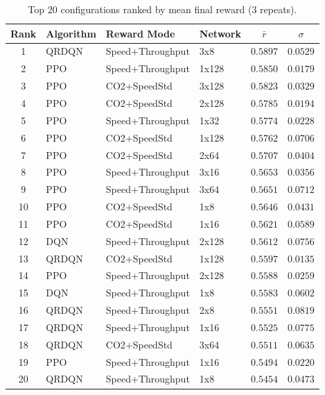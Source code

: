 \begin{table}[htbp]
\centering
\caption{Top 20 configurations ranked by mean final reward (3 repeats).}
\label{tab:top20}
\begin{tabular}{clllcc}
\toprule
Rank & Algorithm & Reward Mode & Network & $\bar{r}$ & $\sigma$ \\
\midrule
1 & QRDQN & Speed+Throughput & 3x8 & $0.5897$ & $0.0529$ \\
2 & PPO & Speed+Throughput & 1x128 & $0.5850$ & $0.0179$ \\
3 & PPO & CO2+SpeedStd & 3x128 & $0.5823$ & $0.0329$ \\
4 & PPO & CO2+SpeedStd & 2x128 & $0.5785$ & $0.0194$ \\
5 & PPO & Speed+Throughput & 1x32 & $0.5774$ & $0.0228$ \\
6 & PPO & CO2+SpeedStd & 1x128 & $0.5762$ & $0.0706$ \\
7 & PPO & CO2+SpeedStd & 2x64 & $0.5707$ & $0.0404$ \\
8 & PPO & Speed+Throughput & 3x16 & $0.5653$ & $0.0356$ \\
9 & PPO & Speed+Throughput & 3x64 & $0.5651$ & $0.0712$ \\
10 & PPO & CO2+SpeedStd & 1x8 & $0.5646$ & $0.0431$ \\
11 & PPO & CO2+SpeedStd & 1x16 & $0.5621$ & $0.0589$ \\
12 & DQN & Speed+Throughput & 2x128 & $0.5612$ & $0.0756$ \\
13 & QRDQN & CO2+SpeedStd & 1x128 & $0.5597$ & $0.0135$ \\
14 & PPO & Speed+Throughput & 2x128 & $0.5588$ & $0.0259$ \\
15 & DQN & Speed+Throughput & 1x8 & $0.5583$ & $0.0602$ \\
16 & QRDQN & Speed+Throughput & 2x8 & $0.5551$ & $0.0819$ \\
17 & QRDQN & Speed+Throughput & 1x16 & $0.5525$ & $0.0775$ \\
18 & QRDQN & CO2+SpeedStd & 3x64 & $0.5511$ & $0.0635$ \\
19 & PPO & Speed+Throughput & 1x16 & $0.5494$ & $0.0220$ \\
20 & QRDQN & Speed+Throughput & 1x8 & $0.5454$ & $0.0473$ \\
\bottomrule
\end{tabular}
\end{table}